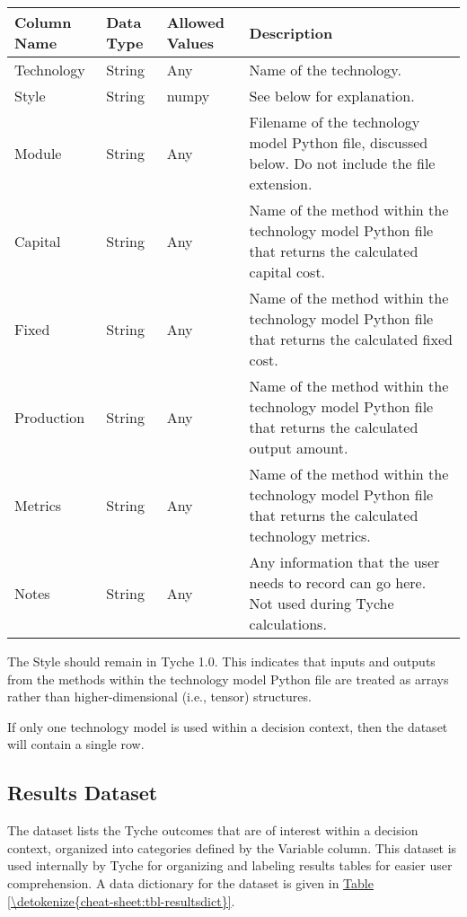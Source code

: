 \documentclass[letterpaper,10pt,english]{sphinxmanual}
\begin{document}
\begin{savenotes}\sphinxattablestart
\centering
{}
\sphinxthecaptionisattop
{}\label{\detokenize{cheat-sheet:table-8}}\label{\detokenize{cheat-sheet:tbl-functionsdict}}
\sphinxaftertopcaption
\begin{tabulary}{\linewidth}[t]{|T|T|T|T|}
\hline
\sphinxstyletheadfamily 
Column Name
&\sphinxstyletheadfamily 
Data Type
&\sphinxstyletheadfamily 
Allowed Values
&\sphinxstyletheadfamily 
Description
\\
\hline
Technology
&
String
&
Any
&
Name of the technology.
\\
\hline
Style
&
String
&
numpy
&
See below for explanation.
\\
\hline
Module
&
String
&
Any
&
Filename of the technology model Python file, discussed below. Do not include the file extension.
\\
\hline
Capital
&
String
&
Any
&
Name of the method within the technology model Python file that returns the calculated capital cost.
\\
\hline
Fixed
&
String
&
Any
&
Name of the method within the technology model Python file that returns the calculated fixed cost.
\\
\hline
Production
&
String
&
Any
&
Name of the method within the technology model Python file that returns the calculated output amount.
\\
\hline
Metrics
&
String
&
Any
&
Name of the method within the technology model Python file that returns the calculated technology metrics.
\\
\hline
Notes
&
String
&
Any
&
Any information that the user needs to record can go here. Not used during Tyche calculations.
\\
\hline
\end{tabulary}
\par
\sphinxattableend\end{savenotes}

The Style should remain  in Tyche 1.0. This indicates that inputs and outputs from the methods within the technology model Python file are treated as arrays rather than higher-dimensional (i.e., tensor) structures.

If only one technology model is used within a decision context, then the  dataset will contain a single row.


\subsection{Results Dataset}
\label{\detokenize{cheat-sheet:results-dataset}}
The  dataset lists the Tyche outcomes that are of interest within a decision context, organized into categories defined by the Variable column. This dataset is used internally by Tyche for organizing and labeling results tables for easier user comprehension. A data dictionary for the  dataset is given in \hyperref[\detokenize{cheat-sheet:tbl-resultsdict}]{Table \ref{\detokenize{cheat-sheet:tbl-resultsdict}}}.
\end{document}
